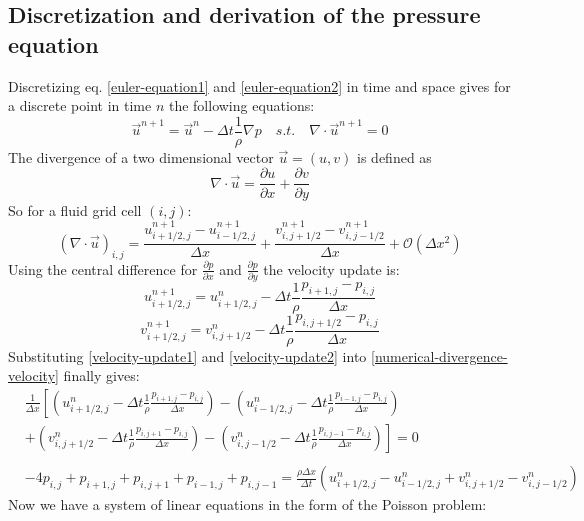 \subsection{Discretization and derivation of the pressure equation}
Discretizing eq. \ref{euler-equation1} and \ref{euler-equation2} in time and space gives for a discrete point in time $n$ the following equations:
\begin{equation} \label{navier-stokes-pressure-numerical1}
    \vec{u}^{n+1} = \vec{u}^{n} - \Delta t \frac{1}{\rho} \nabla p \quad s.t. \quad \nabla \cdot \vec{u}^{n+1} = 0
\end{equation}
The divergence of a two dimensional vector $\vec{u} = (u, v)$ is defined as
\begin{equation} \label{general-divergence}
    \nabla \cdot \vec{u} = \frac{\partial u}{\partial x} + \frac{\partial v}{\partial y}
\end{equation}
So for a fluid grid cell $(i, j)$:
\begin{equation} \label{numerical-divergence-velocity}
    (\nabla \cdot \vec{u})_{i,j} = \frac{u_{i+1/2,j}^{n+1} - u_{i-1/2,j}^{n+1}}{\Delta x} + \frac{v_{i,j+1/2}^{n+1} - v_{i,j-1/2}^{n+1}}{\Delta x} + \mathcal{O}(\Delta x^2)
\end{equation}
Using the central difference for $\frac{\partial p}{\partial x}$ and $\frac{\partial p}{\partial y}$ the velocity update is:
\begin{equation} \label{velocity-update1}
    u_{i+1/2,j}^{n+1} = u_{i+1/2,j}^{n} - \Delta t \frac{1}{\rho} \frac{p_{i+1,j} - p_{i,j}}{\Delta x}
\end{equation}
\begin{equation} \label{velocity-update2}
v_{i+1/2,j}^{n+1} = v_{i,j+1/2}^{n} - \Delta t \frac{1}{\rho} \frac{p_{i,j+1/2} - p_{i,j}}{\Delta x}
\end{equation}
Substituting \ref{velocity-update1} and \ref{velocity-update2} into \ref{numerical-divergence-velocity} finally gives:
\begin{equation} \label{pressure-equation}
    \begin{aligned}
        & \frac{1}{\Delta x}\left[\left(u_{i+1/2,j}^{n} - \Delta t \frac{1}{\rho} \frac{p_{i+1,j} - p_{i,j}}{\Delta x}\right) - \left(u_{i-1/2,j}^{n} - \Delta t \frac{1}{\rho} \frac{p_{i-1,j} - p_{i,j}}{\Delta x}\right) \right. \\
        & + \left. \left(v_{i,j+1/2}^{n} - \Delta t \frac{1}{\rho} \frac{p_{i,j+1} - p_{i,j}}{\Delta x}\right) - \left(v_{i,j-1/2}^{n} - \Delta t \frac{1}{\rho} \frac{p_{i,j-1} - p_{i,j}}{\Delta x} \right) \right] = 0 \\\\
        &  - 4p_{i,j} + p_{i+1,j} + p_{i,j+1} + p_{i-1,j} + p_{i,j-1} = \frac{\rho \Delta x}{\Delta t} \left(u_{i+1/2,j}^{n} - u_{i-1/2,j}^{n} + v_{i,j+1/2}^{n} - v_{i,j-1/2}^{n}\right)
\end{aligned}
\end{equation}
Now we have a system of linear equations in the form of the Poisson problem:

